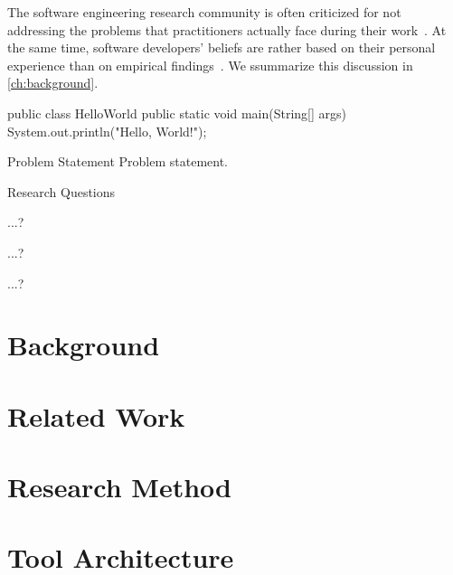 The software engineering research community is often criticized for not addressing the problems that practitioners actually face during their work~\cite{Briand2012}.
At the same time, software developers' beliefs are rather based on their personal experience than on empirical findings~\cite{DevanbuZimmermannOthers2016}.
We s\textsf{s}ummarize this discussion in \autoref{ch:background}.

\begin{java}
public class HelloWorld {
  public static void main(String[] args) {
    System.out.println("Hello, World!");
  }
}
\end{java}


\begin{graybox}{Problem Statement}
Problem statement.
\end{graybox}


\begin{graybox}{Research Questions}
\begin{description}[style=multiline, labelindent=\parindent, leftmargin=\rqindent, itemsep=-1ex]
\item[RQ1] ...?
\item[RQ2] ...?
\item[RQ3] ...?
\end{description}
\end{graybox}

\chapter{Background}
\label{ch:background}

\lipsum[1-12]

\chapter{Related Work}
\label{ch:related-work}

\lipsum[1-4]

\chapter{Research Method}
\label{ch:research-method}

\lipsum[1-4]

\chapter{Tool Architecture}
\label{ch:tool-architecture}

